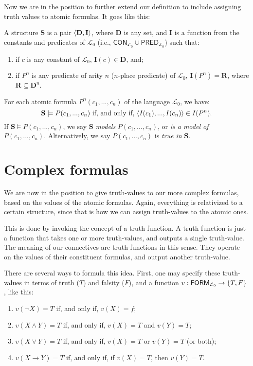 Now we are in the position to further extend our definition to include assigning truth values to atomic formulas. It goes like this: 

\begin{defn} \label{atomicin}
A structure $\mathbf{S}$ is a pair $\langle\mathbf{D}, \mathbf{I}\rangle$, where $\mathbf{D}$ is any set, and $\mathbf{I}$ is a function from the constants and predicates of $\mathcal{L}_0$ (i.e., $\mathsf{CON}_{\mathcal{L}_0} \cup \mathsf{PRED}_{\mathcal{L}_0}$) such that:
\begin{enumerate}
	\item if $c$ is any constant of $\mathcal{L}_0$, $\mathbf{I}(c) \in \mathbf{D}$, and;
	\item if $P^n$ is any predicate  of arity $n$ ($n$-place predicate) of $\mathcal{L}_0$, $\mathbf{I}(P^n)=\mathbf{R}$, where $\mathbf{R} \subseteq \mathbf{D}^n$. 
\end{enumerate}
%
For each atomic formula $P^n(c_1, ..., c_n)$ of the language $\mathcal{L}_0$, we have:
\[
\mathbf{S} \models P(c_1, ..., c_n)\text{ if, and only if, }\langle I(c_1), ..., I(c_n)\rangle \in I(P^n).
\]
If $\mathbf{S} \models P(c_1, ..., c_n)$, we say $\mathbf{S}$ \textit{models} $P(c_1, ..., c_n)$, or \textit{is a model of} $P(c_1, ..., c_n)$. Alternatively, we say $P(c_1, ..., c_n)$ is \textit{true in} $\mathbf{S}$. 
\end{defn}

\section{Complex formulas}

We are now in the position to give truth-values to our more complex formulas, based on the values of the atomic formulas. Again, everything is relativized to a certain structure, since that is how we can assign truth-values to the atomic ones.

This is done by invoking the concept of a truth-function. A truth-function is just a function that takes one or more truth-values, and outputs a single truth-value. The meaning of our connectives are truth-functions in this sense. They operate on the values of their constituent formulas, and output another truth-value. 

There are several ways to formula this idea. First, one may specify these truth-values in terms of truth ($T$) and falsity ($F$), and a function $v: \mathsf{FORM}_{\mathcal{L}_0} \to \{T, F\}$, like this:

\begin{enumerate}
	\item $v(\neg X)=T$ if, and only if, $v(X)=f$;
	\item $v(X \wedge Y)=T$ if, and only if, $v(X)=T$ and $v(Y)=T$;
	\item $v(X \vee Y)=T$ if, and only if, $v(X)=T$ or $v(Y)=T$ (or both);
	\item $v(X \rightarrow Y)=T$ if, and only if, if $v(X)=T$, then $v(Y)=T$. 
\end{enumerate}

